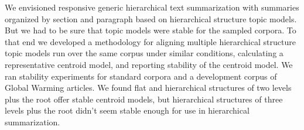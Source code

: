 We envisioned responsive generic hierarchical text summarization with summaries organized by section and paragraph based on hierarchical structure topic models. But we had to be sure that topic models were stable for the sampled corpora. To that end we developed a methodology for aligning multiple hierarchical structure topic models run over the same corpus under similar conditions, calculating a representative centroid model, and reporting stability of the centroid model. We ran stability experiments for standard corpora and a development corpus of Global Warming articles. We found flat and hierarchical structures of two levels plus the root offer stable centroid models, but hierarchical structures of three levels plus the root didn't seem stable enough for use in hierarchical summarization.
